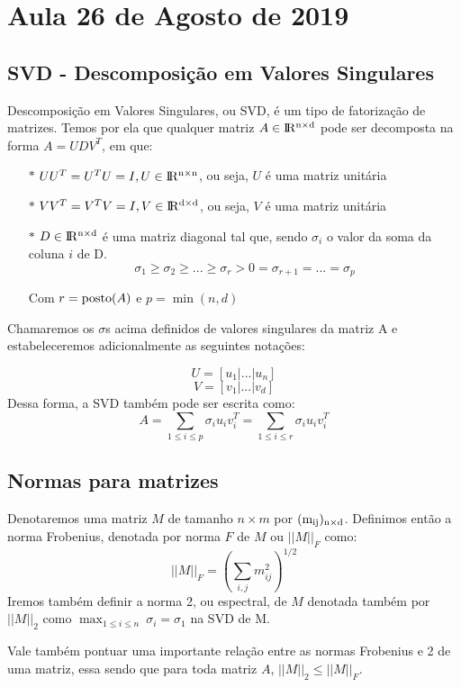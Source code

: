 \section{Aula 26 de Agosto de 2019}
\label{2019_08_26}


\subsection{SVD - Descomposição em Valores Singulares}
\[\]
Descomposição em Valores Singulares, ou SVD, é um tipo de fatorização de matrizes. Temos por ela que qualquer matriz $ A \in {\rm I\!R^{n\times d}}$ pode ser decomposta na forma $A = UDV^T$, em que:

\begin{itemize}
\item[$\ast$]$UU^T = U^TU = I, U \in \rm I\!R^{n\times n}$, ou seja, $U$ é uma matriz unitária
\item[$\ast$]$VV^T = V^TV = I, V \in \rm I\!R^{d\times d}$, ou seja, $V$ é uma matriz unitária
\item[$\ast$]$D \in \rm I\!R^{n\times d}$ é uma matriz diagonal tal que, sendo $\sigma_i$ o valor da soma da coluna $i$ de D.
 \[\sigma_1 \geq \sigma_2 \geq ... \geq \sigma_r > 0 = \sigma_{r+1} = ... = \sigma_p \]
 
Com $ r = \operatorname{posto}(A)$ e $p = \min(n,d)$
\end{itemize}
\[\]
Chamaremos os $\sigma$s acima definidos de valores singulares da matriz A e estabeleceremos adicionalmente as seguintes notações:

\[U = [ u_1 | ... | u_n ]\]
\[V = [v_1 | ... | v_d]\]
\[\]
Dessa forma, a SVD também pode ser escrita como:
\[A = \sum_{1 \leq i \leq p} \sigma_i u_i v_i^T =  \sum_{1 \leq i \leq r} \sigma_i u_i v_i^T \]

\subsection{Normas para matrizes}

Denotaremos uma matriz $M$ de tamanho $n\times m$ por $\rm{(m_{ij})_{n\times d}}$.
Definimos então a norma Frobenius, denotada por norma $F$ de $M$ ou
$||M||_F$ como:
\[||M||_F = ( \sum_{i,j} m_{ij}^2)^{1/2} \]
Iremos também definir a norma 2, ou espectral, de $M$ denotada também por $||M||_2$ como $ \max_{1\leq i \leq n} \ \sigma_i = \sigma_1 $ na SVD de M.

\[\]
Vale também pontuar uma importante relação entre as normas Frobenius e 2 de uma matriz, essa sendo que para toda matriz $A$, $||M||_2 \leq ||M||_F$.

